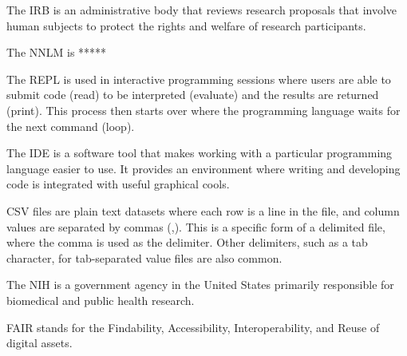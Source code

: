 \documentclass[main.tex]{subfiles}
\begin{document}

  The IRB is an administrative body that reviews research proposals that involve human subjects to protect the rights and welfare of
  research participants.


  The NNLM is ***** %


  The REPL is used in interactive programming sessions where users are able to
  submit code (read) to be interpreted (evaluate) and the results are returned (print).
  This process then starts over where the programming language waits for the next command (loop).


  The IDE is a software tool that makes working with a particular programming language easier to use.
  It provides an environment where writing and developing code is integrated with useful
  graphical cools.


  CSV files are plain text datasets where each row is a line in the file,
  and column values are separated by commas (,).
  This is a specific form of a delimited file, where the comma is used as the delimiter.
  Other delimiters, such as a tab character, for tab-separated value files are also common.


  The NIH is a government agency in the United States primarily responsible for biomedical and public health research.


  FAIR stands for the Findability, Accessibility, Interoperability, and Reuse of digital assets.

\end{document}
